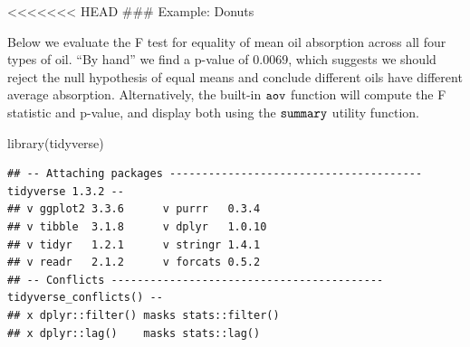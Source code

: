 \documentclass[
]{book}
\newenvironment{Shaded}{\begin{snugshade}}{\end{snugshade}}
\newcommand{\FunctionTok}[1]{\textcolor[rgb]{0.00,0.00,0.00}{#1}}
\newcommand{\NormalTok}[1]{#1}
\begin{document}
\textless\textless\textless\textless\textless\textless\textless{} HEAD
\#\#\# Example: Donuts

Below we evaluate the F test for equality of mean oil absorption across all four types of oil. ``By hand'' we find a p-value of 0.0069, which suggests we should reject the null hypothesis of equal means and conclude different oils have different average absorption. Alternatively, the built-in \({\tt aov}\) function will compute the F statistic and p-value, and display both using the \({\tt summary}\) utility function.

\begin{Shaded}
\begin{Highlighting}[]
\FunctionTok{library}\NormalTok{(tidyverse)}
\end{Highlighting}
\end{Shaded}

\begin{verbatim}
## -- Attaching packages --------------------------------------- tidyverse 1.3.2 --
## v ggplot2 3.3.6      v purrr   0.3.4 
## v tibble  3.1.8      v dplyr   1.0.10
## v tidyr   1.2.1      v stringr 1.4.1 
## v readr   2.1.2      v forcats 0.5.2 
## -- Conflicts ------------------------------------------ tidyverse_conflicts() --
## x dplyr::filter() masks stats::filter()
## x dplyr::lag()    masks stats::lag()
\end{verbatim}
\end{document}

